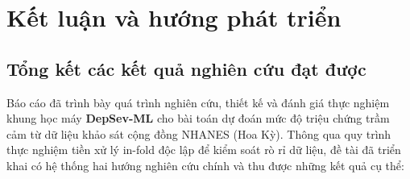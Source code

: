 \chapter{Kết luận và hướng phát triển}
\label{ch:ket-luan}

\section{Tổng kết các kết quả nghiên cứu đạt được}
\label{sec:ket-luan-khoa-hoc}

Báo cáo đã trình bày quá trình nghiên cứu, thiết kế và đánh giá thực nghiệm khung học máy \textbf{DepSev-ML} cho bài toán dự đoán mức độ triệu chứng trầm cảm từ dữ liệu khảo sát cộng đồng NHANES (Hoa Kỳ). Thông qua quy trình thực nghiệm tiền xử lý in-fold độc lập để kiểm soát rò rỉ dữ liệu, đề tài đã triển khai có hệ thống hai hướng nghiên cứu chính và thu được những kết quả cụ thể:

